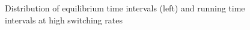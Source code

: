 \documentclass[12pt,a4paper]{article}
\begin{document}
\begin{figure}[H]
	\hspace*{-0.5cm}
	\caption{Distribution of equilibrium time intervals (left) and running time intervals at high switching rates}
	\label{intdistrinzel}
\end{figure}
\end{document}
